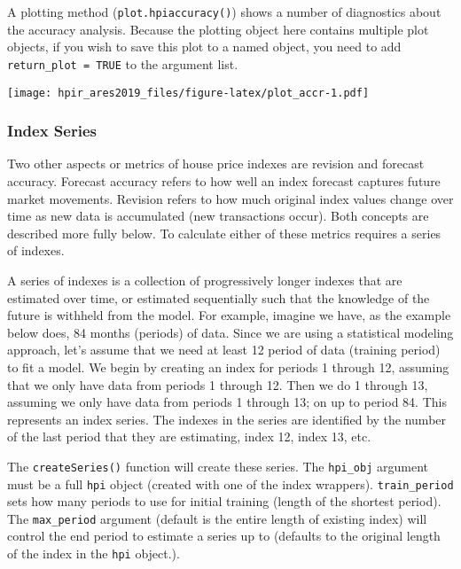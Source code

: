 \documentclass[]{article}
\newenvironment{Shaded}{\begin{snugshade}}{\end{snugshade}}
\newcommand{\KeywordTok}[1]{\textcolor[rgb]{0.13,0.29,0.53}{\textbf{#1}}}
\newcommand{\OperatorTok}[1]{\textcolor[rgb]{0.81,0.36,0.00}{\textbf{#1}}}
\newcommand{\NormalTok}[1]{#1}
\begin{document}
A plotting method (\texttt{plot.hpiaccuracy()}) shows a number of
diagnostics about the accuracy analysis. Because the plotting object
here contains multiple plot objects, if you wish to save this plot to a
named object, you need to add \texttt{return\_plot\ =\ TRUE} to the
argument list.

\begin{Shaded}
\end{Shaded}

\texttt{[image: hpir\_ares2019\_files/figure-latex/plot\_accr-1.pdf]}

\subsubsection{Index Series}\label{index-series}

Two other aspects or metrics of house price indexes are revision and
forecast accuracy. Forecast accuracy refers to how well an index
forecast captures future market movements. Revision refers to how much
original index values change over time as new data is accumulated (new
transactions occur). Both concepts are described more fully below. To
calculate either of these metrics requires a series of indexes.

A series of indexes is a collection of progressively longer indexes that
are estimated over time, or estimated sequentially such that the
knowledge of the future is withheld from the model. For example, imagine
we have, as the example below does, 84 months (periods) of data. Since
we are using a statistical modeling approach, let's assume that we need
at least 12 period of data (training period) to fit a model. We begin by
creating an index for periods 1 through 12, assuming that we only have
data from periods 1 through 12. Then we do 1 through 13, assuming we
only have data from periods 1 through 13; on up to period 84. This
represents an index series. The indexes in the series are identified by
the number of the last period that they are estimating, index 12, index
13, etc.

The \texttt{createSeries()} function will create these series. The
\texttt{hpi\_obj} argument must be a full \texttt{hpi} object (created
with one of the index wrappers). \texttt{train\_period} sets how many
periods to use for initial training (length of the shortest period). The
\texttt{max\_period} argument (default is the entire length of existing
index) will control the end period to estimate a series up to (defaults
to the original length of the index in the \texttt{hpi} object.).
\end{document}
